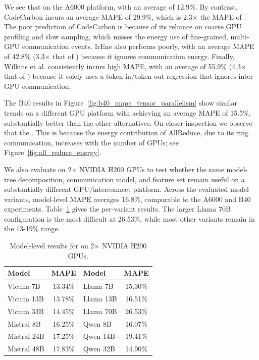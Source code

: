 We see that  on the A6000 platform, with an average of 12.9\%.
By contrast, CodeCarbon incurs an average MAPE of 29.9\%, which is 2.3$\times$ the MAPE of \sys{}.
The poor prediction of CodeCarbon is because of its reliance on coarse GPU profiling and slow sampling, which misses the energy use of fine-grained, multi-GPU communication events.
IrEne also performs poorly, with an average MAPE of 42.8\% (3.3$\times$ that of \sys{}) because it ignores communication energy.
Finally, Wilkins et al. consistently incurs high MAPE, with an average of 55.9\% (4.3$\times$ that of \sys{}) because it solely uses a token-in/token-out regression that ignores inter-GPU communication.

The B40 results in Figure~\ref{fig:b40_mape_tensor_parallelism} show similar trends on a different GPU platform with \sys{} achieving an average MAPE of 15.5\%, substantially better than the other alternatives.
On closer inspection we observe that the .
This is because the energy contribution of AllReduce, due to its ring communication, increases with the number of GPUs; see Figure~\ref{fig:all_reduce_energy}.

We also evaluate \sys{} on 2$\times$ NVIDIA H200 GPUs to test whether the same model-tree decomposition, communication model, and feature set remain useful on a substantially different GPU/interconnect platform. Across the evaluated model variants, model-level MAPE averages 16.8\%, comparable to the A6000 and B40 experiments. Table~\ref{tab:h200_model_results} gives the per-variant results. The larger Llama 70B configuration is the most difficult at 26.53\%, while most other variants remain in the 13-19\% range.

\begin{table}[t]
\centering
\small
\setlength{\tabcolsep}{5pt}
\renewcommand{\arraystretch}{1.05}
\begin{tabular}{lclc}
\toprule
\textbf{Model} & \textbf{MAPE} & \textbf{Model} & \textbf{MAPE} \\
\midrule
\rowcolor{rowblue} Vicuna 7B  & 13.34\% & Llama 7B  & 15.30\% \\
Vicuna 13B                    & 13.78\% & Llama 13B & 16.51\% \\
\rowcolor{rowblue} Vicuna 33B & 14.45\% & Llama 70B & 26.53\% \\
Mistral 8B                    & 16.25\% & Qwen 8B   & 16.07\% \\
\rowcolor{rowblue} Mistral 24B & 17.25\% & Qwen 14B  & 19.41\% \\
Mistral 48B                   & 17.83\% & Qwen 32B  & 14.90\% \\
\bottomrule
\end{tabular}
\vspace{5pt}
\caption{Model-level results for \sys{} on 2$\times$ NVIDIA H200 GPUs.}
\vspace{-5pt}
\label{tab:h200_model_results}
\end{table}

